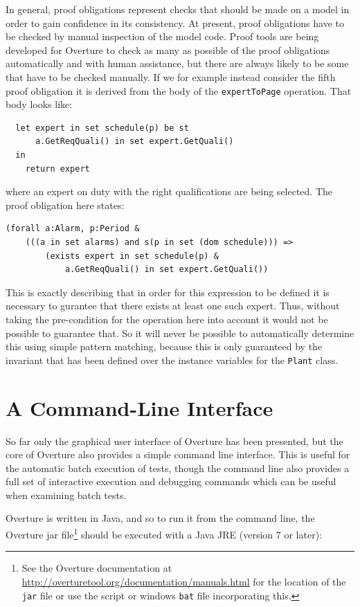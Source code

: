 In general, proof obligations represent checks that should be made on a model in order to gain confidence in its consistency. At present, proof obligations have to be checked by manual inspection of the model code. Proof tools are being developed for Overture to check as many as possible of the proof obligations automatically and with human assistance, but there are always likely to be some that have to be checked manually. If we for example instead consider the fifth proof obligation it is derived from the body of the \texttt{expertToPage} operation. That body looks like:

\begin{lstlisting}
  let expert in set schedule(p) be st
      a.GetReqQuali() in set expert.GetQuali()
  in
    return expert
\end{lstlisting}

\noindent where an expert on duty with the right qualifications are
being selected. The proof obligation here states:

\begin{lstlisting}
(forall a:Alarm, p:Period &
	(((a in set alarms) and s(p in set (dom schedule))) => 
		(exists expert in set schedule(p) &
			a.GetReqQuali() in set expert.GetQuali())
\end{lstlisting}

\noindent This is exactly describing that in order for this expression to be defined it is necessary to gurantee that there exists at least one such expert. Thus, without taking the pre-condition for the operation here into account it would not be possible to guarantee that. So it will never be possible to automatically determine this using simple pattern matching, because this is only guaranteed by the invariant that has been defined over the instance variables for the \texttt{Plant} class.
%
\section{A Command-Line Interface}\label{sec:cmdline}
So far only the graphical user interface of Overture has been presented, but the core of Overture also provides a simple command line interface.  This is useful for the automatic batch execution of tests, though the command line also provides a full set of interactive execution and debugging commands which can be useful when examining batch tests. 

Overture is written in Java, and so to run it from the command line, the Overture jar file\footnote{See the Overture documentation at \url{http://overturetool.org/documentation/manuals.html} for the location of the \texttt{jar} file or use the script or windows \texttt{bat} file incorporating this.} should be executed with a Java JRE (version 7 or later):

